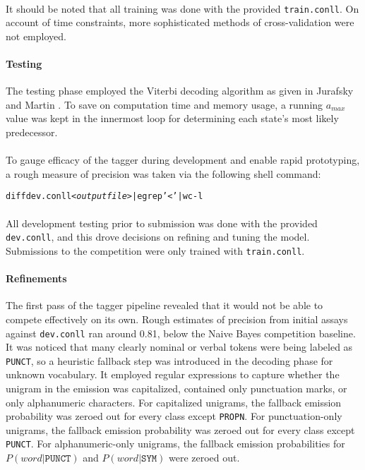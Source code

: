 \documentclass[11pt,a4paper]{article}
\begin{document}
\paragraph{}
It should be noted that all training was done with the provided \texttt{train.conll}.
On account of time constraints, more sophisticated methods of cross-validation \cite[86-87]{JurafskyMartin}
were not employed.

\paragraph{Testing}
The testing phase employed the Viterbi decoding algorithm as given in Jurafsky and
Martin . To save on computation time and memory usage,
a running $a_{max}$ value was kept in the innermost loop for determining each
state's most likely predecessor.

\paragraph{}
To gauge efficacy of the tagger during development and enable rapid prototyping,
a rough measure of precision was taken via the following shell command:

\begin{alltt}
  {\tiny diff dev.conll <\emph{output file}> | egrep '<' | wc -l}
\end{alltt}

\paragraph{}
All development testing prior to submission was done with the provided
\texttt{dev.conll}, and this drove decisions on refining and tuning the model.
Submissions to the competition were only trained with \texttt{train.conll}.

\paragraph{Refinements}
The first pass of the tagger pipeline revealed that it would not be able to compete effectively on its own.
Rough estimates of precision from initial assays against \texttt{dev.conll} ran around 0.81, below the
Naive Bayes competition baseline. It was noticed that many clearly nominal or
verbal tokens were being labeled as \texttt{PUNCT}, so a heuristic fallback step was
introduced in the decoding phase for unknown vocabulary. It employed regular expressions
to capture whether the unigram in the emission was capitalized, contained only punctuation
marks, or only alphanumeric characters. For capitalized unigrams, the fallback emission
probability was zeroed out for every class except \texttt{PROPN}. For
punctuation-only unigrams, the fallback emission probability was zeroed out for every
class except \texttt{PUNCT}. For alphanumeric-only unigrams,
the fallback emission probabilities for $P(word|\texttt{PUNCT})$ and $P(word|\texttt{SYM})$
were zeroed out.
\end{document}

